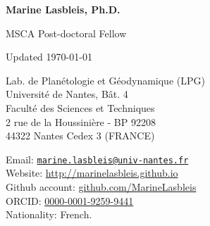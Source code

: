 \documentclass{cv}
\author{Marine Lasbleis}
\begin{document}
\begin{minipage}{0.6\textwidth}
{\Large{\textbf{Marine Lasbleis, Ph.D.}

MSCA Post-doctoral Fellow}}
\end{minipage}
\hfill
\begin{minipage}{0.38\textwidth}
\begin{flushright}
Updated \today
\end{flushright}
\end{minipage}
\vspace{0.4cm}

\begin{minipage}{0.5\linewidth}
Lab. de Plan\'etologie et G\'eodynamique 
(LPG)\\
Universit\'e de Nantes, B\^at. 4\\
Facult\'e des Sciences et Techniques\\
  2 rue de la Houssini\`ere - BP 92208\\
  44322 Nantes Cedex 3 (FRANCE)
\end{minipage}
\hfill
  \begin{minipage}{0.45\linewidth}
	Email: \texttt{\href{mailto:marine.lasbleis@univ-nantes.fr}{marine.lasbleis@univ-nantes.fr}}\\
	Website:  \href{http://marinelasbleis.github.io}{http://marinelasbleis.github.io}\\
	Github account: \href{https://github.com/MarineLasbleis}{github.com/MarineLasbleis}\\
	ORCID: \href{http://orcid.org/0000-0001-9259-9441}{0000-0001-9259-9441}\\
	Nationality: French.
\end{minipage}


\vspace{0.5cm}




\end{document}
